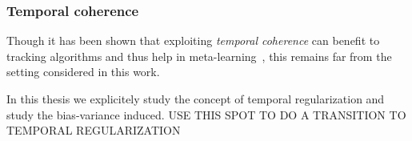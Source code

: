 \subsubsection{Temporal coherence}
Though it has been shown that exploiting \emph{temporal coherence} can benefit to tracking algorithms and thus help in meta-learning~\citep{sutton2007role}, this remains far from the setting considered in this work.

In this thesis we explicitely study the concept of temporal regularization and study the bias-variance induced.
USE THIS SPOT TO DO A TRANSITION TO TEMPORAL REGULARIZATION
